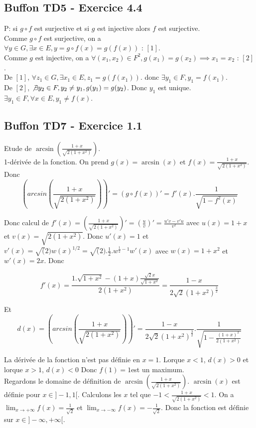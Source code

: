 \documentclass[]{book}
\theoremstyle{definition}
\begin{document}
\subsection*{Buffon TD5 - Exercice 4.4}
P:  si $g \circ f$ est surjective et si $g$ est injective alors $f$ est surjective.\\
Comme $g \circ f$ est surjective, on a $\forall y \in G, \exists x \in E, y = g \circ f(x)=g(f(x)) \textrm{  : } [1]$.\\
Comme $g$ est injective, on a $\forall (x_1, x_2) \in F^2, g(x_1) = g(x_2) \implies x_1 = x_2 \textrm{  : }[2]$.\\

De $[1]$, $\forall z_1 \in G, \exists x_1 \in E, z_1 = g(f(x_1))$. donc $\exists y_1 \in F, y_1 = f(x_1)$.\\ 
De $[2]$, $\not \exists y_2 \in F, y_2 \neq y_1, g(y_1) = g(y_2)$. Donc $y_1$ est unique.\\
$\exists y_1 \in F, \forall x \in E, y_1 \neq f(x)$.


\newpage
\subsection*{Buffon TD7 - Exercice 1.1}
Etude de $\arcsin(\frac{1+x}{\sqrt{2(1+x^2)}})$.\\
1-d\'eriv\'ee de la fonction. On prend $g(x) = \arcsin(x)$ et $f(x)=\frac{1+x}{\sqrt{2(1+x^2)}}$. Donc
$$\left(arcsin(\frac{1+x}{\sqrt{2(1+x^2)}})\right)' = (g \circ f(x))' = f'(x).\frac{1}{\sqrt{1-f^2(x)}}$$

Donc calcul de $f'(x) = \left(\frac{1+x}{\sqrt{2(1+x^2)}}\right)' = \left(\frac{u}{v}\right)' = \frac{u'v-v'u}{v^2}$ avec $u(x) = 1+x$ et $v(x)=\sqrt{2(1+x^2)}$. Donc $u'(x) = 1$ et $v'(x) = \sqrt(2)w(x)^{1/2} = \sqrt(2).\frac{1}{2}.w^{\frac{1}{2}-1}w'(x)$ avec $w(x) = 1+x^2$ et $w'(x) = 2x$. Donc

$$f'(x) = \frac{1.\sqrt{1+x^2}-(1+x)\frac{\sqrt{2}x}{\sqrt{1+x^2}}}{2(1+x^2)}  = \frac{1-x}{2\sqrt{2}(1+x^2)^{\frac{3}{2}}}$$

Et
$$d(x) = \left(arcsin(\frac{1+x}{\sqrt{2(1+x^2)}})\right)' = \frac{1-x}{2\sqrt{2}(1+x^2)^{\frac{3}{2}}}.\frac{1}{\sqrt{1-\frac{(1+x)^2}{2(1+x^2)}}}$$

La d\'eriv\'ee de la fonction n'est pas d\'efinie en $x=1$.
Lorque $x<1$, $d(x) > 0$ et lorque $x>1$, $d(x) < 0$ Donc $f(1) = 1 $est un maximum.\\

Regardons le domaine de d\'efinition de $\arcsin(\frac{1+x}{\sqrt{2(1+x^2)}})$. $\arcsin(x)$ est d\'efinie pour $x \in ]-1,1[$. Calculons les $x$ tel que $-1 < \frac{1+x}{\sqrt{2(1+x^2)}} < 1$. On a $\lim_{x\to+\infty} f(x) = \frac{1}{\sqrt{2}}$ et $\lim_{x\to-\infty} f(x) = -\frac{1}{\sqrt{2}}$. Donc la fonction est d\'efinie sur $x \in ]-\infty, +\infty[$.\\
\end{document}

